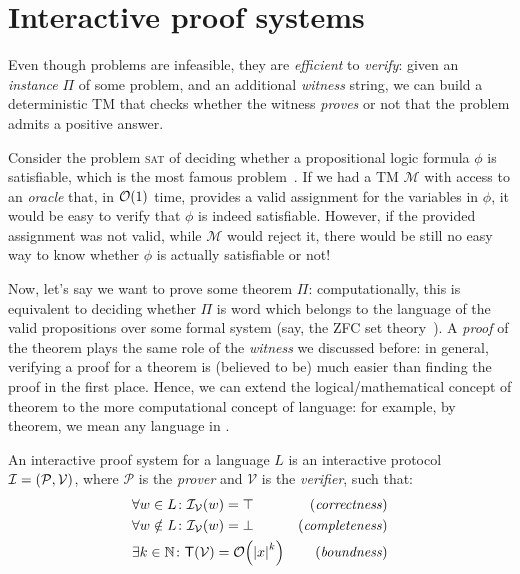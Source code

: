 \section{Interactive proof systems}
Even though \NPcomplete{} problems are infeasible, they are \emph{efficient} to \emph{verify}: 
given an \emph{instance} \(\Pi \) of some \NPcomplete{} problem, and an additional \emph{witness}
string, we can build a deterministic TM that checks whether the witness \emph{proves} or 
not that the problem admits a positive answer.
\begin{example}
  Consider the problem \textsc{sat} of deciding whether a propositional logic formula \(\phi \) is 
  satisfiable, which is the most famous \NPcomplete{} problem~\cite{Cook1971}. 
  If we had a TM \(\mathcal{M}\) with access to an \emph{oracle} that, in \(\BigO{1}\) time, 
  provides a valid assignment for the variables in \(\phi \), it would be easy to 
  verify that \(\phi \) is indeed satisfiable.
  However, if the provided assignment was not valid, while \(\mathcal{M}\) would reject it, 
  there would be still no easy way to know whether \(\phi \) is actually satisfiable or not! 
\end{example}

Now, let's say we want to prove some theorem \(\Pi \): computationally, this is equivalent to 
deciding whether \(\Pi \) is word which belongs to the language of the valid propositions over some 
formal system (say, the ZFC set theory~\cite{FraenkelHL1973}).
A \emph{proof} of the theorem plays the same role of the \emph{witness} we discussed before: in 
general, verifying a proof for a theorem is (believed to be) much easier than finding the proof in 
the first place.
Hence, we can extend the logical/mathematical concept of theorem to the more computational concept 
of language: for example, by \NPtime{} theorem, we mean any language in \NPtime{}.

\clearpage
\begin{definition}  
  An interactive proof system for a language \(L\) is an interactive protocol 
  \(\mathcal{I} = \left(\mathcal{P}, \mathcal{V}\right)\), where \(\mathcal{P}\) is the \emph{prover}
  and \(\mathcal{V}\) is the \emph{verifier}, such that:
  \begin{align*}
    & \forall w \in L\colon \call{\mathcal{I}_{\mathcal{V}}}{w} = \top & 
      \textnormal{(\emph{correctness})} \\
    & \forall w \notin L\colon \call{\mathcal{I}_{\mathcal{V}}}{w} = \bot & 
      \textnormal{(\emph{completeness})} \\
    & \exists k \in \mathbb{N}\colon \call{\Time}{\mathcal{V}} = \BigO{\abs{x}^k} & 
    \textnormal{(\emph{boundness})}
  \end{align*}
\end{definition}

